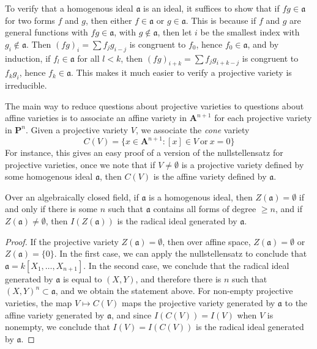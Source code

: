 To verify that a homogenous ideal $\mathfrak{a}$ is an ideal, it suffices to show that if $fg \in \mathfrak{a}$ for two forms $f$ and $g$, then either $f \in \mathfrak{a}$ or $g \in \mathfrak{a}$. This is because if $f$ and $g$ are general functions with $fg \in \mathfrak{a}$, with $g \not \in \mathfrak{a}$, then let $i$ be the smallest index with $g_i \not \in \mathfrak{a}$. Then $(fg)_i = \sum f_jg_{i-j}$ is congruent to $f_0$, hence $f_0 \in \mathfrak{a}$, and by induction, if $f_l \in \mathfrak{a}$ for all $l < k$, then $(fg)_{i+k} = \sum f_jg_{i+k-j}$ is congruent to $f_kg_i$, hence $f_k \in \mathfrak{a}$. This makes it much easier to verify a projective variety is irreducible.

The main way to reduce questions about projective varieties to questions about affine varieties is to associate an affine variety in $\mathbf{A}^{n+1}$ for each projective variety in $\mathbf{P}^n$. Given a projective variety $V$, we associate the \emph{cone} variety
%
\[ C(V) = \{ x \in \mathbf{A}^{n+1}: [x] \in V\ \text{or}\ x = 0 \} \]
%
For instance, this gives an easy proof of a version of the nullstellensatz for projective varieties, once we note that if $V \neq \emptyset$ is a projective variety defined by some homogenous ideal $\mathfrak{a}$, then $C(V)$ is the affine variety defined by $\mathfrak{a}$.

\begin{theorem}
    Over an algebraically closed field, if $\mathfrak{a}$ is a homogenous ideal, then $Z(\mathfrak{a}) = \emptyset$ if and only if there is some $n$ such that $\mathfrak{a}$ contains all forms of degree $\geq n$, and if $Z(\mathfrak{a}) \neq \emptyset$, then $I(Z(\mathfrak{a}))$ is the radical ideal generated by $\mathfrak{a}$.
\end{theorem}
\begin{proof}
    If the projective variety $Z(\mathfrak{a}) = \emptyset$, then over affine space, $Z(\mathfrak{a}) = \emptyset$ or $Z(\mathfrak{a}) = \{ 0 \}$. In the first case, we can apply the nullstellensatz to conclude that $\mathfrak{a} = k[X_1, \dots, X_{n+1}]$. In the second case, we conclude that the radical ideal generated by $\mathfrak{a}$ is equal to $(X,Y)$, and therefore there is $n$ such that $(X,Y)^n \subset \mathfrak{a}$, and we obtain the statement above. For non-empty projective varieties, the map $V \mapsto C(V)$ maps the projective variety generated by $\mathfrak{a}$ to the affine variety generated by $\mathfrak{a}$, and since $I(C(V)) = I(V)$ when $V$ is nonempty, we conclude that $I(V) = I(C(V))$ is the radical ideal generated by $\mathfrak{a}$.
\end{proof}

